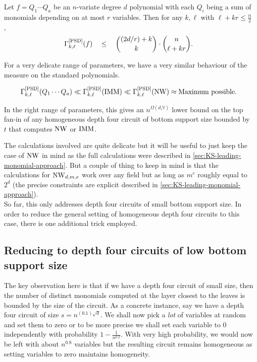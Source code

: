 \begin{lemma*}
Let $f = Q_1\cdots Q_a$ be an $n$-variate degree $d$ polynomial with each $Q_i$ being a sum of monomials depending on at most $r$ variables. Then for any $k,\ell$ with $\ell + kr\leq \frac{n}{2}$, 
\[
\Gamma^{\mathrm{[PSD]}}_{k,\ell}(f) \quad \leq \quad \binom{(2d/r) + k}{k} \cdot \binom{n}{\ell + kr}.
\]
\end{lemma*}

For a very delicate range of parameters, we have a very similar behaviour of the measure on the standard polynomials. 

\[
\Gamma^{\mathrm{[PSD]}}_{k,\ell}(Q_1\cdots Q_a) \ll \Gamma^{\mathrm{[PSD]}}_{k,\ell}(\operatorname{\mathrm{IMM}}) \ll \Gamma^{\mathrm{[PSD]}}_{k,\ell}(\operatorname{\mathrm{NW}}) \approx \text{Maximum possible}.
\]

In the right range of parameters, this gives an $n^{\Omega(d/t)}$ lower bound on the top fan-in of any homogeneous depth four circuit of bottom support size bounded by $t$ that computes $\operatorname{\mathrm{NW}}$ or $\operatorname{\mathrm{IMM}}$. 

The calculations involved are quite delicate but it will be useful to just keep the case of $\operatorname{\mathrm{NW}}$ in mind as the full calculations were described in \autoref{sec:KS-leading-monomial-approach}. But a couple of thing to keep in mind is that the calculations for $\operatorname{\mathrm{NW}}_{d,m,e}$ work over any field but as long as $m^e$ roughly equal to $2^d$ (the precise constraints are explicit described in \autoref{sec:KS-leading-monomial-approach}). \\

So far, this only addresses depth four circuits of small bottom support size. In order to reduce the general setting of homogeneous depth four circuits to this case, there is one additional trick employed. 

\subsection{Reducing  to depth four circuits of low bottom support size}

The key observation here is that if we have a depth four circuit of small size, then the number of distinct monomials computed at the layer closest to the leaves is bounded by the size of the circuit.
As a concrete instance, say we have a depth four circuit of size $s = n^{(0.1) \sqrt{d}}$.
We shall now pick a \emph{lot} of variables at random and set them to zero or to be more precise we shall set each variable to $0$ independently with probability $1 - \frac{1}{n^{0.2}}$. With very high probability, we would now be left with about $n^{0.8}$ variables but the resulting circuit remains homogeneous as setting variables to zero maintains homogeneity. 

